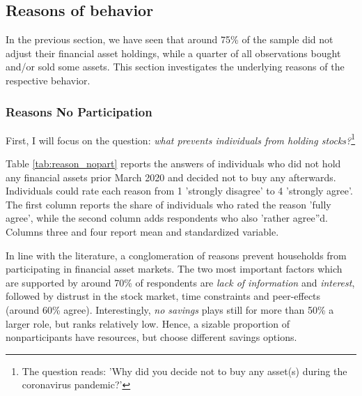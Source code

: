 \documentclass[ProjectABM]{subfiles}
\begin{document}




\subsection{Reasons of behavior}
In the previous section, we have seen that around 75\% of the sample did not adjust their financial asset holdings, while a quarter of all observations bought and/or sold some assets. This section investigates the underlying reasons of the respective behavior.

\subsubsection{Reasons No Participation}
First, I will focus on the question: \textit{what prevents individuals from holding stocks?}\footnote{The question reads: 'Why did you decide not to buy any asset(s) during the coronavirus pandemic?'} 

Table \ref{tab:reason_nopart} reports the answers of individuals who did not hold any financial assets prior March 2020 and decided not to buy any afterwards. Individuals could rate each reason from 1 'strongly disagree' to 4 'strongly agree'. The first column reports the share of individuals who rated the reason 'fully agree', while the second column adds respondents who also 'rather agree''d. Columns three and four report mean and standardized variable. %

In line with the literature, a conglomeration of reasons prevent households from participating in financial asset markets. The two most important factors which are supported by around 70\% of respondents are \textit{lack of information} and \textit{interest}, followed by distrust in the stock market, time constraints and peer-effects (around 60\% agree). Interestingly, \textit{no savings} plays still for more than 50\% a larger role, but ranks relatively low. Hence, a sizable proportion of nonparticipants have resources, but choose different savings options. %
\end{document}
